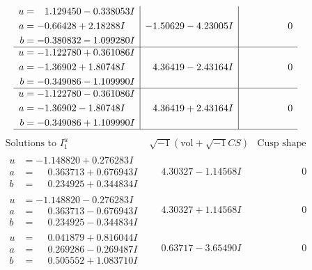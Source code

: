 \documentclass[1p]{elsarticle_modified}
\theoremstyle{definition}
\newcommand{\I}{\sqrt{-1}}
\begin{document}
$$\begin{array}{c|c|c}
\begin{aligned}
u &= \phantom{-}1.129450 - 0.338053 I \\
a &= -0.66428 + 2.18288 I \\
b &= -0.380832 - 1.099280 I\end{aligned}
 & -1.50629 - 4.23005 I & \phantom{-0.000000 } 0 \\ \hline\begin{aligned}
u &= -1.122780 + 0.361086 I \\
a &= -1.36902 + 1.80748 I \\
b &= -0.349086 - 1.109990 I\end{aligned}
 & \phantom{-}4.36419 - 2.43164 I & \phantom{-0.000000 } 0 \\ \hline\begin{aligned}
u &= -1.122780 - 0.361086 I \\
a &= -1.36902 - 1.80748 I \\
b &= -0.349086 + 1.109990 I\end{aligned}
 & \phantom{-}4.36419 + 2.43164 I & \phantom{-0.000000 } 0\\
 \hline 
 \end{array}$$\newpage$$\begin{array}{c|c|c}  
\text{Solutions to }I^u_{1}& \I (\text{vol} + \sqrt{-1}CS) & \text{Cusp shape}\\
 \hline 
\begin{aligned}
u &= -1.148820 + 0.276283 I \\
a &= \phantom{-}0.363713 + 0.676943 I \\
b &= \phantom{-}0.234925 + 0.344834 I\end{aligned}
 & \phantom{-}4.30327 - 1.14568 I & \phantom{-0.000000 } 0 \\ \hline\begin{aligned}
u &= -1.148820 - 0.276283 I \\
a &= \phantom{-}0.363713 - 0.676943 I \\
b &= \phantom{-}0.234925 - 0.344834 I\end{aligned}
 & \phantom{-}4.30327 + 1.14568 I & \phantom{-0.000000 } 0 \\ \hline\begin{aligned}
u &= \phantom{-}0.041879 + 0.816044 I \\
a &= \phantom{-}0.269286 - 0.269487 I \\
b &= \phantom{-}0.505552 + 1.083710 I\end{aligned}
 & \phantom{-}0.63717 - 3.65490 I & \phantom{-0.000000 } 0 \\ \hline\begin{aligned}

\end{aligned}
\end{array}$$
\end{document}
